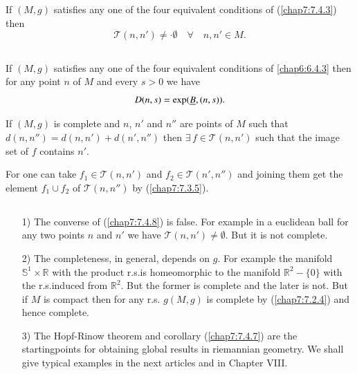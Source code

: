 \begin{coro*}
If $(M,g)$ satisfies any one of the four equivalent conditions of
(\ref{chap7:7.4.3}) then
$$
\mathscr{T}(n,n')\neq \cdot \emptyset\quad\forall\quad n,n'\in M.
$$
\end{coro*}


\subsection{}\label{chap7:7.4.9}

\begin{coro*}
If $(M,g)$ satisfies any one of the four equivalent conditions of
\eqref{chap6:6.4.3} then for any point $n$ of $M$ and every $s>0$ we have
$$
D(n,s)=\exp(\underline{B},(n,s)).
$$
\end{coro*}

\begin{coro*}\label{chap7:7.4.10}
If $(M,g)$ is complete and $n$, $n'$ and $n''$ are points of $M$ such
that $d(n,n'')=d(n,n')+d(n',n'')$ then $\exists\, f\in
\mathscr{T}(n,n')$ such that the image set of $f$ contains $n'$.
\end{coro*}

For \pageoriginale one can take $f_{1}\in\mathscr{T}(n,n')$ and
$f_{2}\in \mathscr{T}(n',n'')$ and joining them get the element
$f_{1}\cup f_{2}$ of $\mathscr{T}(n,n'')$ by (\ref{chap7:7.3.5}). 

\subsection{}\label{chap7:7.4.11}

\begin{remarks*}
\begin{itemize}
\item[1)] The converse of (\ref{chap7:7.4.8}) is false. For example in a
  euclidean ball for any two points $n$ and $n'$ we have
  $\mathscr{T}(n,n')\neq \emptyset$. But it is not complete.

\item[2)] The completeness, in general, depends on $g$. For example
  the manifold $\mathbb{S}^{1}\times \mathbb{R}$ with the product
  r.s.\@ is homeomorphic to the manifold $\mathbb{R}^{2}-\{0\}$ with
  the r.s.\@ induced from $\mathbb{R}^{2}$. But the former is complete
  and the later is not. But if $M$ is compact then for any r.s.\@
  $g(M,g)$ is complete by (\ref{chap7:7.2.4}) and hence complete.

\item[3)] The Hopf-Rinow theorem and corollary (\ref{chap7:7.4.7}) are the
  starting\break points for obtaining global results in riemannian
  geometry. We shall give typical examples in the next articles and in
  Chapter VIII.
\end{itemize}
\end{remarks*}

